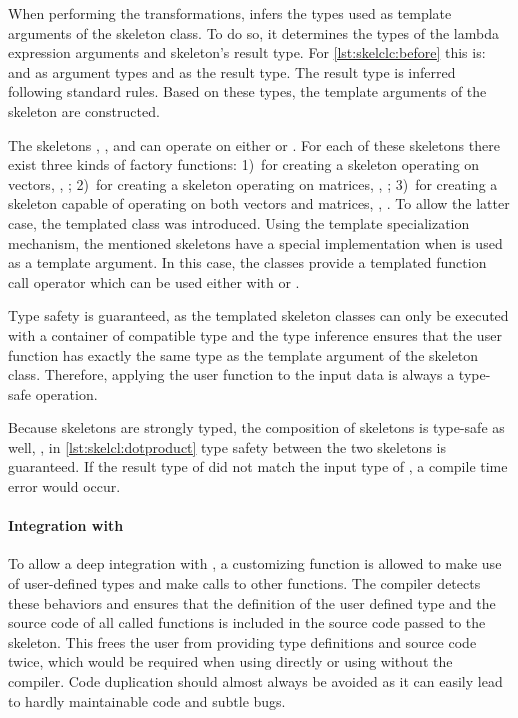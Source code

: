 When performing the transformations,  infers the types used as template arguments of the skeleton class.
To do so, it determines the types of the lambda expression arguments and skeleton's result type.
For \autoref{lst:skelclc:before} this is:  and  as argument types and  as the result type.
The result type is inferred following standard \Cpp rules.
Based on these types, the template arguments of the skeleton are constructed.

The skeletons \map, \zip, and \stencil can operate on either  or .
For each of these skeletons there exist three kinds of factory functions:
1)~for creating a skeleton operating on vectors, \eg, ;
2)~for creating a skeleton operating on matrices, \eg, ;
3)~for creating a skeleton capable of operating on both vectors and matrices, \eg, .
To allow the latter case, the templated class  was introduced.
Using the template specialization mechanism, the mentioned skeletons have a special implementation when  is used as a template argument.
In this case, the classes provide a templated function call operator which can be used either with  or .

Type safety is guaranteed, as the templated skeleton classes can only be executed with a container of compatible type and the type inference ensures that the user function has exactly the same type as the template argument of the skeleton class.
Therefore, applying the user function to the input data is always a type-safe operation.

Because skeletons are strongly typed, the composition of skeletons is type-safe as well, \ie, in \autoref{lst:skelcl:dotproduct} type safety between the two skeletons is guaranteed.
If the result type of  did not match the input type of , a compile time error would occur.

\paragraph{Integration with \Cpp}
To allow a deep integration with \Cpp, a customizing function is allowed to make use of user-defined types and make calls to other functions.
The  compiler detects these behaviors and ensures that the definition of the user defined type and the source code of all called functions is included in the source code passed to the skeleton.
This frees the user from providing type definitions and source code twice, which would be required when using \OpenCL directly or using \SkelCL without the  compiler.
Code duplication should almost always be avoided as it can easily lead to hardly maintainable code and subtle bugs.

